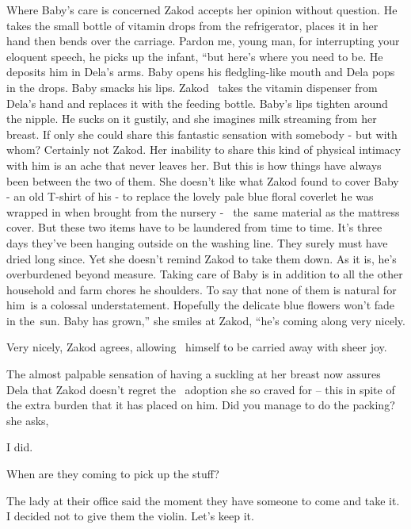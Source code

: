 \documentclass[letterpaper]{article}
\begin{document}
Where Baby's care is concerned Zakod accepts her opinion without question. He takes the small bottle of vitamin drops
from the refrigerator, places it in her hand then bends over the carriage. {\textquotedbl}Pardon me, young man, for
interrupting your eloquent speech,{\textquotedbl} he picks up the infant, ``but here's where you need to
be.{\textquotedbl} He deposits him in Dela's arms. Baby opens his fledgling-like mouth and Dela pops in the drops. Baby
smacks his lips. Zakod \ takes the vitamin dispenser from Dela's hand and replaces it with the feeding bottle. Baby's
lips tighten around the nipple. He sucks on it gustily, and she imagines milk streaming from her breast. If only she
could share this fantastic sensation with somebody - but with whom? Certainly not Zakod. Her inability to share this
kind of physical intimacy with him is an ache that never leaves her. But this is how things have always been between
the two of them. She doesn't like what Zakod found to cover Baby - an old T-shirt of his - to replace the lovely pale
blue floral coverlet he was wrapped in when brought from the nursery - \ the~same material as the mattress cover. But
these two items have to be laundered from time to time. It's three days they've been hanging outside on the washing
line. They surely must have dried long since. Yet she doesn't remind Zakod to take them down. As it is, he's
overburdened beyond measure. Taking care of Baby is in addition to all the other household and farm chores he
shoulders. To say that none of them is natural for him~is a colossal understatement. Hopefully the delicate blue
flowers won't fade in the~sun. {\textquotedbl}Baby has grown,'' she smiles at Zakod, ``he's coming along very
nicely.{\textquotedbl} 

{\textquotedbl}Very nicely,{\textquotedbl} Zakod agrees, allowing \ himself to be carried away with sheer joy. 

The almost palpable sensation of having a suckling at her breast now assures Dela that Zakod doesn't regret the~
adoption she so craved for -- this in spite of the extra burden that it has placed on him. {\textquotedbl}Did you
manage to do the packing?{\textquotedbl} she asks,

{\textquotedbl}I did.{\textquotedbl} 

{\textquotedbl}When are they coming to pick up the stuff?{\textquotedbl} 

{\textquotedbl}The lady at their office said the moment they have someone to come and take it. I decided not to give
them the violin. Let's keep it.{\textquotedbl}
\end{document}
